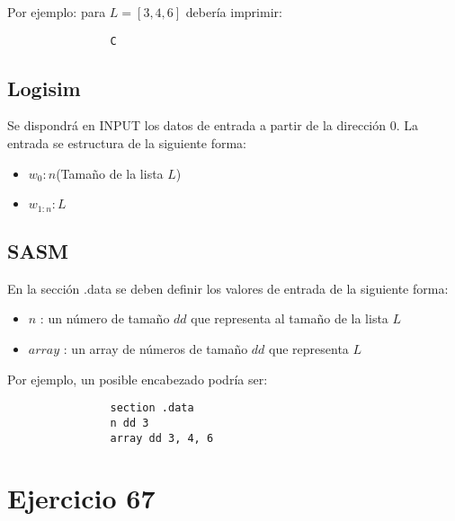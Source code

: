 \documentclass[a4paper]{article}
\begin{document}
\begin{flushleft}
      		 Por ejemplo: para $L = [3, 4, 6]$ debería imprimir:
      		 
      		 \begin{lstlisting}
      		 	C
      		 \end{lstlisting}
      		 
      		\subsection*{Logisim}
      		
      		Se dispondrá en INPUT los datos de entrada a partir de la dirección 0. La entrada se estructura de la siguiente forma:
      		
      		\begin{itemize}
      			
      			\item $w_{0}: n $(Tamaño de la lista $L$)
      			\item $w_{1:n} : L$
      		\end{itemize}
      		 
      		 	\subsection*{SASM}
      		 
      		 En la sección .data se deben definir los valores de entrada de la siguiente forma:
      		 
      		 \begin{itemize}
      		 	
      		 	\item $n$ : un número de tamaño $dd$ que representa al tamaño de la lista $L$
      		 	
      		 	\item $array$ : un array de números de tamaño $dd$ que representa $L$
      		 	
      		 	
      		 \end{itemize}
      		 
      		 Por ejemplo, un posible encabezado podría ser:
      		 
      		 \begin{lstlisting}
      		 	section .data
      		 	n dd 3
      		 	array dd 3, 4, 6
      		 \end{lstlisting}
      		 
      		 
      		 \section{Ejercicio 67}
      		 

\end{flushleft}
\end{document}
